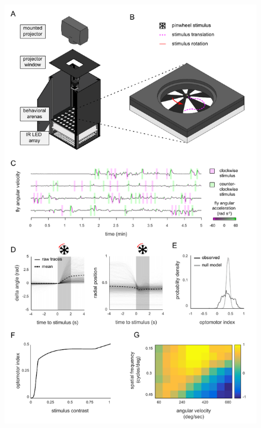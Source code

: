 \documentclass[10pt,letterpaper]{article}
\begin{document}
\clearpage
\begin{figure}
	\includegraphics[width=\linewidth]{../../figures/optomotor_panel_sm.pdf}
\end{figure}
\end{document}
